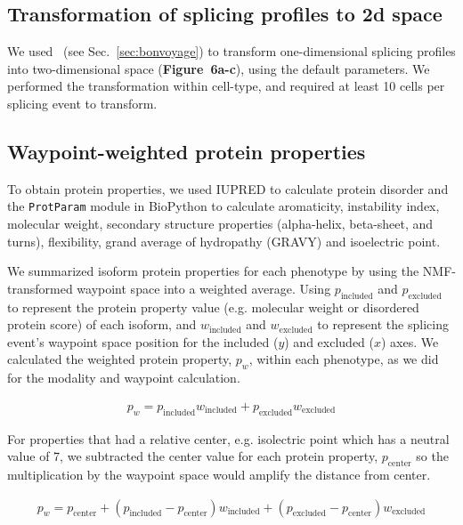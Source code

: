 \subsection{Transformation of splicing profiles to 2d space}

We used \bonvoyage\, (see Sec.~\ref{sec:bonvoyage}) to transform one-dimensional splicing profiles into two-dimensional space (\textbf{Figure~6a-c}), using the default parameters. We performed the transformation within cell-type, and required at least 10 cells per splicing event to transform.

\subsection{Waypoint-weighted protein properties}

To obtain protein properties, we used IUPRED\cite{Dosztanyi:2005gq} to calculate protein disorder and the \texttt{ProtParam} module in BioPython\cite{Cock:2009hj} to calculate aromaticity, instability index, molecular weight, secondary structure properties (alpha-helix, beta-sheet, and turns), flexibility, grand average of hydropathy (GRAVY) and isoelectric point.



We summarized isoform protein properties for each phenotype by using the NMF-transformed waypoint space into a weighted average. Using $p_{\text{included}}$ and $p_{\text{excluded}}$ to represent the protein property value (e.g. molecular weight or disordered protein score) of each isoform, and $w_{\text{included}}$ and $w_{\text{excluded}}$ to represent the splicing event's waypoint space position for the included ($y$) and excluded ($x$) axes. We calculated the weighted protein property, $p_w$, within each phenotype, as we did for the modality and waypoint calculation.

\begin{align}
p_w = p_{\text{included}} w_{\text{included}} + p_{\text{excluded}} w_{\text{excluded}}
\end{align}

For properties that had a relative center, e.g. isolectric point which has a neutral value of 7, we subtracted the center value for each protein property, $p_{\text{center}}$ so the multiplication by the waypoint space would amplify the distance from center.

\begin{align}
p_w = p_{\text{center}} + (p_{\text{included}} - p_{\text{center}}) w_{\text{included}} + (p_{\text{excluded}} - p_{\text{center}}) w_{\text{excluded}}
\end{align}

